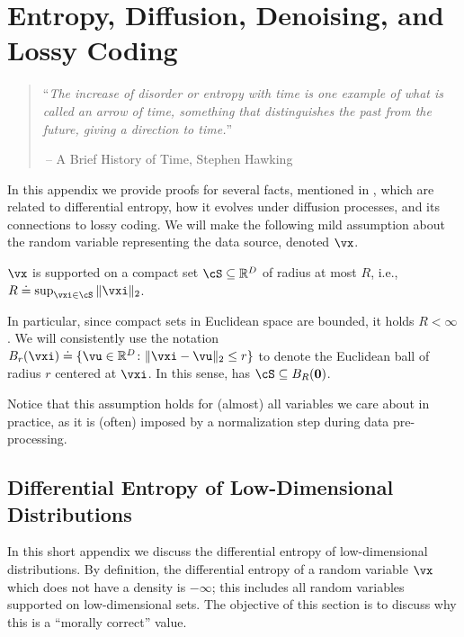 \documentclass[../../book-main.tex]{subfiles}
\begin{document}
\chapter{Entropy, Diffusion, Denoising, and Lossy Coding}\label{app:entropy}\label{app:diffusion-denoising}

\begin{quote}
``{\em The increase of disorder or entropy with time is one example of what is called an arrow of time, something that distinguishes the past from the future, giving a direction to time.}''

$~$\hfill -- A Brief History of Time, Stephen Hawking
 \end{quote}
\vspace{5mm}

In this appendix we provide proofs for several facts, mentioned in
, which are related to differential entropy, how
it evolves under diffusion processes, and its connections to lossy coding. We
will make the following mild assumption about the random variable representing
the data source, denoted \(\vx\).

\begin{assumption}\label{assumption:entropy_x_compact_support}
    \(\vx\) is supported on a compact set \(\cS \subseteq \R^{D}\) of radius at most \(R\), i.e., \(R \doteq \sup_{\vxi \in \cS}\norm{\vxi}_{2}\).
\end{assumption}

In particular, since compact sets in Euclidean space are bounded, it holds \(R < \infty\). We will consistently use the notation \(B_{r}(\vxi) \doteq \{\vu \in \R^{D} \colon \norm{\vxi - \vu}_{2} \leq r\}\) to denote the Euclidean ball of radius \(r\) centered at \(\vxi\). In this sense,  has \(\cS \subseteq B_{R}(\vzero)\).

Notice that this assumption holds for (almost) all variables we care about in practice, as it is (often) imposed by a normalization step during data pre-processing. 

\section{Differential Entropy of Low-Dimensional Distributions}\label{sec:low_dim_entropy}

In this short appendix we discuss the differential entropy of low-dimensional distributions. By definition, the differential entropy of a random variable \(\vx\) which does not have a density  is \(-\infty\); this includes all random variables supported on low-dimensional sets. The objective of this section is to discuss why this is a ``morally correct'' value.
\end{document}
